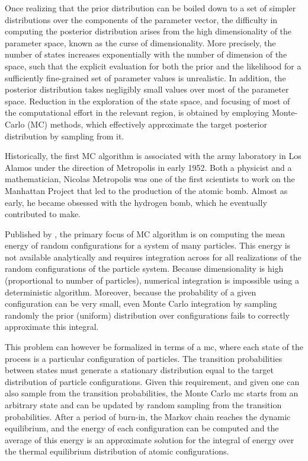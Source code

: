 Once realizing that the \gls{prior} distribution can be boiled down to a set of simpler distributions over the components of the parameter vector, the difficulty in computing the posterior distribution arises from the high dimensionality of the parameter space, known as the curse of dimensionality.
More precisely, the number of states increases exponentially with the number of dimension of the space, such that the explicit evaluation for both the prior and the likelihood for a sufficiently fine-grained set of parameter values is unrealistic.
In addition, the posterior distribution takes negligibly small values over most of the parameter space.
Reduction in the exploration of the state space, and focusing of most of the computational effort in the relevant region, is obtained by employing Monte-Carlo (MC) methods, which effectively approximate the target posterior distribution by sampling from it.

Historically, the first \acrshort{MC} algorithm is associated with the army laboratory in Los Alamos under the direction of Metropolis in early 1952.
Both a physicist and a mathematician, Nicolas Metropolis was one of the first scientists to work on the Manhattan Project that led to the production of the atomic bomb.
Almost as early, he became obsessed with the hydrogen bomb, which he eventually contributed to make.

Published by \citet{Metropolis1953}, the primary focus of \acrshort{MC} algorithm is on computing the mean energy of random configurations for a system of many particles.
This energy is not available analytically and requires integration across for all realizations of the random configurations of the particle system.
Because dimensionality is high (proportional to number of particles), numerical integration is impossible using a deterministic algorithm.
Moreover, because the probability of a given configuration can be very small, even Monte Carlo integration by sampling randomly the prior (uniform) distribution over configurations fails to correctly approximate this integral.

This problem can however be formalized in terms of a \gls{mc}, where each state of the process is a particular configuration of particles.
The {transition} probabilities between states must generate a stationary distribution equal to the target distribution of particle configurations.
Given this requirement, and given one can also sample from the {transition} probabilities, the Monte Carlo \gls{mc} starts from an arbitrary state and can be updated by random sampling from the {transition} probabilities.
After a period of burn-in, the Markov chain reaches the dynamic equilibrium, and the energy of each configuration can be computed and the average of this energy is an approximate solution for the integral of energy over the thermal equilibrium distribution of atomic configurations.

